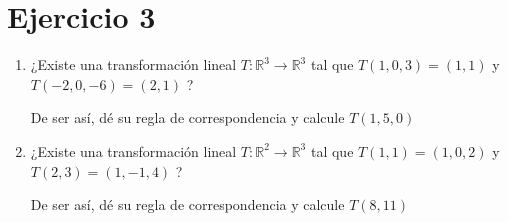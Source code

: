 \section*{Ejercicio 3}

\begin{enumerate}
    \item ¿Existe una transformación lineal $T: \mathbb{R}^{3} \rightarrow \mathbb{R}^{3}$
    tal que $T(1,0,3) = (1,1)$ y $T(-2,0,-6) = (2,1)$ ?

    De ser así, dé su regla de correspondencia y calcule $T(1,5,0)$

    \item ¿Existe una transformación lineal $T: \mathbb{R}^{2} \rightarrow \mathbb{R}^{3}$
    tal que $T(1,1) = (1,0,2)$ y $T(2,3) = (1,-1,4)$ ?

    De ser así, dé su regla de correspondencia y calcule $T(8,11)$
\end{enumerate}